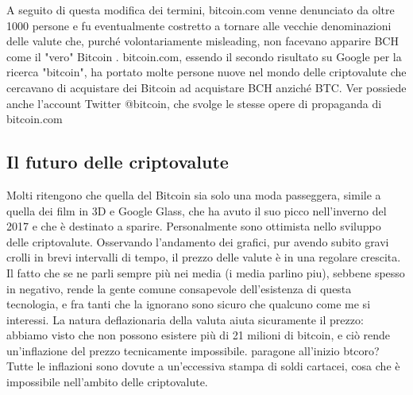 \documentclass {article}
\begin{document}
A seguito di questa modifica dei termini, bitcoin.com venne denunciato da oltre 1000 persone e fu eventualmente costretto a tornare alle vecchie denominazioni delle valute che, purché volontariamente misleading, non facevano apparire BCH come il "vero" Bitcoin \cite{verlawsuit}.
bitcoin.com, essendo il secondo risultato su Google per la ricerca "bitcoin", ha portato molte persone nuove nel mondo delle criptovalute che cercavano di acquistare dei Bitcoin ad acquistare BCH anziché BTC.
Ver possiede anche l'account Twitter @bitcoin, che svolge le stesse opere di propaganda di bitcoin.com


\subsection {Il futuro delle criptovalute}


Molti ritengono che quella del Bitcoin sia solo una moda passeggera, simile a quella dei film in 3D e Google Glass, che ha avuto il suo picco nell'inverno del 2017 e che è destinato a sparire.
Personalmente sono ottimista nello sviluppo delle criptovalute.
Osservando l'andamento dei grafici, pur avendo subito gravi crolli in brevi intervalli di tempo, il prezzo delle valute è in una regolare crescita.
Il fatto che se ne parli sempre più nei media (i media parlino piu), sebbene spesso in negativo, rende la gente comune consapevole dell'esistenza di questa tecnologia, e fra tanti che la ignorano sono sicuro che qualcuno come me si interessi.
La natura deflazionaria della valuta aiuta sicuramente il prezzo: abbiamo visto che non possono esistere più di 21 milioni di bitcoin, e ciò rende un'inflazione del prezzo tecnicamente impossibile. paragone all'inizio btcoro?
Tutte le inflazioni sono dovute a un'eccessiva stampa di soldi cartacei, cosa che è impossibile nell'ambito delle criptovalute.

\newpage

\printbibliography
 
\end{document}
